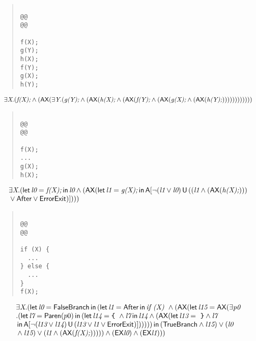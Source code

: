 \documentclass{article}
\newcommand{\U}{\,\mbox{\sf{U}}\,}
\newcommand{\A}{\mbox{\sf{A}}}
\newcommand{\AX}{\mbox{\sf{AX}}}
\newcommand{\EX}{\mbox{\sf{EX}}}
\newcommand{\mita}[1]{\mbox{\it{{#1}}}}
\newcommand{\msf}[1]{\mbox{\sf{{#1}}}}
\newcommand{\ttlb}{\mbox{\tt \char'173}}
\newcommand{\ttrb}{\mbox{\tt \char'175}}
\begin{document}
\begin{quote}\begin{verbatim}

@@
@@

f(X);
g(Y);
h(X);
f(Y);
g(X);
h(Y);
\end{verbatim}\end{quote}

\[\begin{array}{l}
\exists \mita{X} . (\mita{f(X);} \wedge (\AX(\exists \mita{Y} . (\mita{g(Y);} \wedge (\AX(\mita{h(X);} \wedge (\AX(\mita{f(Y);} \wedge (\AX(\mita{g(X);} \wedge (\AX(\mita{h(Y);}))))))))))))
\end{array}\]

\begin{quote}\begin{verbatim}

@@
@@

f(X);
...
g(X);
h(X);
\end{verbatim}\end{quote}

\[\begin{array}{l}
\exists \mita{X} . (\mita{\sf{let}} \, \mita{l0} = \mita{f(X);} \, \mita{\sf{in}} \, \mita{l0} \wedge (\AX(\mita{\sf{let}} \, \mita{l1} = \mita{g(X);} \, \mita{\sf{in}} \, \A[\neg (\mita{l1} \vee \mita{l0}) \U ((\mita{l1} \wedge (\AX(\mita{h(X);})))\\\mbox{} \vee \msf{After} \vee \msf{ErrorExit})]

))
)
\end{array}\]

\begin{quote}\begin{verbatim}

@@
@@

if (X) {
  ...
} else {
  ...
}
f(X);
\end{verbatim}\end{quote}

\[\begin{array}{l}
\exists \mita{X} . (\mita{\sf{let}} \, \mita{l0} = \msf{FalseBranch} \, \mita{\sf{in}} \, (\mita{\sf{let}} \, \mita{l1} = \msf{After} \, \mita{\sf{in}} \, \mita{if (X) } \wedge (\AX(\mita{\sf{let}} \, \mita{l15} = \AX(\exists \mita{p0}\\\mbox{} . (\mita{\sf{let}} \, \mita{l7} = \msf{Paren}(p0) \, \mita{\sf{in}} \, (\mita{\sf{let}} \, \mita{l14} = \mita{{\ttlb}
  } \wedge \mita{l7} \, \mita{\sf{in}} \, \mita{l14} \wedge (\AX(\mita{\sf{let}} \, \mita{l13} = \mita{
{\ttrb}} \wedge \mita{l7}\\\mbox{} \, \mita{\sf{in}} \, \A[\neg (\mita{l13} \vee \mita{l14}) \U (\mita{l13} \vee \mita{l1} \vee \msf{ErrorExit})]

))
)
)) \, \mita{\sf{in}} \, (\msf{TrueBranch} \wedge \mita{l15}) \vee (\mita{l0}\\\mbox{} \wedge \mita{l15}) \vee (\mita{l1} \wedge (\AX(\mita{f(X);})))
)) \wedge (\EX\mita{l0}) \wedge (\EX\mita{l1})
)
)
\end{array}\]
\end{document}
